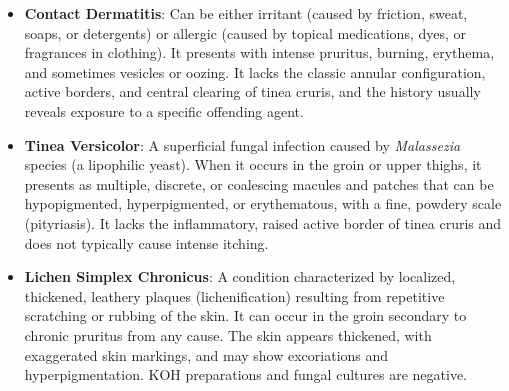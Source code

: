 \begin{itemize}
    \item \textbf{Contact Dermatitis}: Can be either irritant (caused by friction, sweat, soaps, or detergents) or allergic (caused by topical medications, dyes, or fragrances in clothing). It presents with intense pruritus, burning, erythema, and sometimes vesicles or oozing. It lacks the classic annular configuration, active borders, and central clearing of tinea cruris, and the history usually reveals exposure to a specific offending agent.
    \item \textbf{Tinea Versicolor}: A superficial fungal infection caused by \textit{Malassezia} species (a lipophilic yeast). When it occurs in the groin or upper thighs, it presents as multiple, discrete, or coalescing macules and patches that can be hypopigmented, hyperpigmented, or erythematous, with a fine, powdery scale (pityriasis). It lacks the inflammatory, raised active border of tinea cruris and does not typically cause intense itching.
    \item \textbf{Lichen Simplex Chronicus}: A condition characterized by localized, thickened, leathery plaques (lichenification) resulting from repetitive scratching or rubbing of the skin. It can occur in the groin secondary to chronic pruritus from any cause. The skin appears thickened, with exaggerated skin markings, and may show excoriations and hyperpigmentation. KOH preparations and fungal cultures are negative.
\end{itemize}

